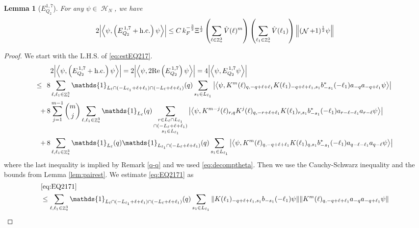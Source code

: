 \documentclass[sn-mathphys, Numbered ,a4paper]{sn-jnl}%
\DeclareMathOperator{\Z}{\mathbb{Z}}
\DeclareMathOperator{\HH}{\mathcal{H}}
\DeclareMathOperator{\NN}{\mathcal{N}}
\newcommand{\half}{\frac{1}{2}}
\newcommand{\eva}[1]{\left\langle #1 \right\rangle}
\theoremstyle{plain}
\newtheorem{lemma}[theorem]{Lemma}
\theoremstyle{definition}
\theoremstyle{remark}
\theoremstyle{plain}
\theoremstyle{definition}
\theoremstyle{remark}
\begin{document}
\begin{lemma}[$E_{Q_2}^{1,7}$]
	For any $\psi \in \HH_N$, we have
	\begin{align}
		2\abs{\eva{\psi,\left(E^{\,1,7}_{Q_2}+\mathrm{h.c.}\right) \psi }}
		\leq C\, k_{F}^{-\frac{3}{2}} \Xi^{\half} \left(\sum\limits_{\ell\in \Z^3_*} \hat{V}(\ell)^m \right) \left(\sum\limits_{\ell_1\in \Z^3_*} \hat{V}(\ell_1) \right) \norm{(\NN+1)^\half \psi } \label{eq:estEQ217}
	\end{align}
\end{lemma}
\begin{proof}
 We start with the L.H.S. of \eqref{eq:estEQ217}.
\begin{align}
	&2\abs{\eva{\psi,\left(E^{\,1,7}_{Q_2}+\mathrm{h.c.}\right) \psi }} =2 \abs{\eva{\psi,2\mathrm{Re}\left(E^{\,1,7}_{Q_2}\right) \psi }} = 4\abs{\eva{\psi, E^{\,1,7}_{Q_2} \psi }}\nonumber\\
	\leq\,\;8& \sum\limits_{\ell, \ell_1\in \Z^3_*} \mathds{1}_{L_{\ell} \cap (-L_{\ell_1}+\ell+\ell_1) \cap (-L_{\ell}+\ell+\ell_1)}(q) \sum\limits_{s_1 \in L_{\ell_1}} \abs{\eva{\psi, K^m(\ell)_{q,-q+\ell+\ell_1} K(\ell_1)_{-q+\ell+\ell_1,s_1} b^*_{-s_1}(-\ell_1) a_{-q} a_{-q+\ell_1} \psi}} \label{eq:EQ2171}\\
	+\,8& \sum\limits_{j=1}^{m-1} {{m}\choose j} \sum\limits_{\ell, \ell_1\in \Z^3_*}\mathds{1}_{L_{\ell}}(q) \sum\limits_{\substack{r\in L_{\ell} \cap L_{\ell_1} \\ \cap (-L_{\ell}+\ell+\ell_1)\\s_1\in L_{\ell_1}}}  \abs{\eva{\psi, K^{m-j}(\ell)_{r,q} K^j(\ell)_{q,-r+\ell+\ell_1} K(\ell_1)_{r,s_1} b^*_{-s_1}(-\ell_1)a_{r-\ell-\ell_1}a_{r-\ell} \psi }} \label{eq:EQ2172}\\
	+\,8&\sum\limits_{\ell, \ell_1\in \Z^3_*} \mathds{1}_{L_{\ell}}(q) \mathds{1}_{L_{\ell_1}\cap (-L_{\ell}+\ell+\ell_1)}(q) \sum\limits_{s_1\in L_{\ell_1}} \abs{\eva{\psi, K^m(\ell)_{q,-q+\ell+\ell_1} K(\ell_1)_{q,s_1} b^*_{-s_1}(-\ell_1)a_{q-\ell-\ell_1}a_{q-\ell} \psi }} \label{eq:EQ2173}
\end{align}
where the last inequality is implied by Remark \ref{q-q} and we used \eqref{eq:decomptheta}.
Then we use the Cauchy-Schwarz inequality and the bounds from Lemma \ref{lem:pairest}.
We estimate \eqref{eq:EQ2171} as 
\begin{align}
	&\eqref{eq:EQ2171}\nonumber\\
	&\leq \sum\limits_{\ell, \ell_1\in \Z^3_*} \mathds{1}_{L_{\ell} \cap (-L_{\ell_1}+\ell+\ell_1) \cap (-L_{\ell}+\ell+\ell_1)}(q) \sum\limits_{s_1 \in L_{\ell_1}} \norm{  K(\ell_1)_{-q+\ell+\ell_1,s_1} b_{-s_1}(-\ell_1) \psi}\norm{ K^m(\ell)_{q,-q+\ell+\ell_1}a_{-q}a_{-q+\ell_1} \psi }\nonumber\\

\end{align}
\end{proof}
\end{document}
